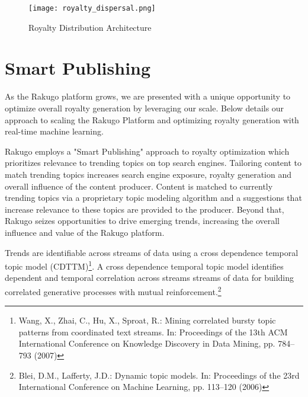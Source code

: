 \documentclass{article}
\begin{document}
\begin{figure}[H]
\centering
\texttt{[image: royalty\_dispersal.png]}
\caption{Royalty Distribution Architecture}
\end{figure}

\section{Smart Publishing}
As the Rakugo platform grows, we are presented with a unique opportunity to optimize overall royalty generation by leveraging our scale. Below details our approach to scaling the Rakugo Platform and optimizing royalty generation with real-time machine learning.

Rakugo employs a "Smart Publishing" approach to royalty optimization which prioritizes relevance to trending topics on top search engines. Tailoring content to match trending topics increases search engine exposure, royalty generation and overall influence of the content producer. Content is matched to currently trending topics via a proprietary topic modeling algorithm and a suggestions that increase relevance to these topics are provided to the producer. Beyond that, Rakugo seizes opportunities to drive emerging trends, increasing the overall influence and value of the Rakugo platform. 

Trends are identifiable across streams of data using a cross dependence temporal topic model (CDTTM)\footnote{Wang, X., Zhai, C., Hu, X., Sproat, R.: Mining correlated bursty topic patterns from coordinated text streams. In: Proceedings of the 13th ACM International Conference on Knowledge Discovery in Data Mining, pp. 784–793 (2007)}. A cross dependence temporal topic model identifies dependent and temporal correlation across streams streams of data for building correlated generative processes with mutual reinforcement.\footnote{Blei, D.M., Lafferty, J.D.: Dynamic topic models. In: Proceedings of the 23rd International Conference on Machine Learning, pp. 113–120 (2006)}
\end{document}
